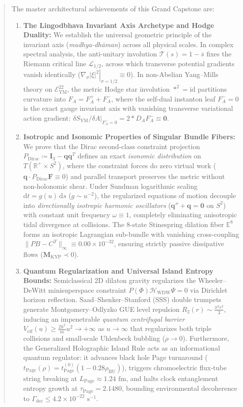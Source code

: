 \documentclass[11pt,a4paper,reqno]{article}
\theoremstyle{plain}
\theoremstyle{definition}
\theoremstyle{remark}
\numberwithin{equation}{section}
\numberwithin{table}{section}
\newcommand{\Eym}{\mathcal{E}_{\mathrm{YM}}^{22}}
\providecommand{\diff}{\mathrm{d}}
\begin{document}
\begin{abstract}
The master architectural achievements of this Grand Capstone are:
\begin{enumerate}[label=\textbf{(\roman*)}, leftmargin=2.2em]
  \item \textbf{The Lingodbhava Invariant Axis Archetype and Hodge Duality:} We establish the universal geometric principle of the invariant axis (\emph{madhya-dh\={a}man}) across all physical scales. In complex spectral analysis, the anti-unitary involution $\mathcal{T}(s) = 1 - \bar{s}$ fixes the Riemann critical line $\mathcal{L}_{1/2}$, across which transverse potential gradients vanish identically ($\left.\nabla_\sigma |\xi|^2\right|_{\sigma=1/2} \equiv 0$). In non-Abelian Yang--Mills theory on $\Eym$, the metric Hodge star involution $*^2 = \mathrm{id}$ partitions curvature into $F_A = F_A^+ + F_A^-$, where the self-dual instanton leaf $F_A^- = 0$ is the exact gauge invariant axis with vanishing transverse variational action gradient: $\left.\delta S_{\mathrm{YM}}/\delta A\right|_{F_A^- = 0} = 2*D_A F_A^- \equiv \mathbf{0}$.
  \item \textbf{Isotropic and Isonomic Properties of Singular Bundle Fibers:} We prove that the Dirac second-class constraint projection $P_{\mathrm{Dirac}} \coloneqq \bm{I}_3 - \bm{q}\bm{q}^T$ defines an exact \emph{isonomic distribution} on $T(\mathbb{R}^+ \times S^2)$, where the constraint forces do zero virtual work ($\bm{q} \cdot P_{\mathrm{Dirac}}\bm{F} \equiv 0$) and parallel transport preserves the metric without non-holonomic shear. Under Sundman logarithmic scaling $\diff t = g(u)\,\diff s$ ($g \sim u^{-2}$), the regularized equations of motion decouple into \emph{directionally isotropic harmonic oscillators} ($\bm{q}'' + \bm{q} = \bm{0}$ on $S^2$) with constant unit frequency $\omega \equiv 1$, completely eliminating anisotropic tidal divergence at collisions. The 8-state Stinespring dilation fiber $\mathbb{E}^8$ forms an isotropic Lagrangian sub-bundle with vanishing cross-coupling $\|PB - C^T\|_\infty \equiv 0.00 \times 10^{-32}$, ensuring strictly passive dissipative flows ($\mathbf{M}_{\mathrm{KYP}} \prec 0$).
  \item \textbf{Quantum Regularization and Universal Island Entropy Bounds:} Semiclassical 2D dilaton gravity regularizes the Wheeler--DeWitt minisuperspace constraint $P(\Phi)\mathcal{H}_{\mathrm{WDW}}\Psi = 0$ via Dirichlet horizon reflection. Saad--Shenker--Stanford (SSS) double trumpets generate Montgomery--Odlyzko GUE level repulsion $R_2(r) \sim \frac{\pi^2 r^2}{3}$, inducing an impenetrable \emph{quantum centrifugal barrier} $V_{\mathrm{eff}}(u) \ge \frac{2\hbar^2}{m}u^2 \to +\infty$ as $u \to \infty$ that regularizes both triple collisions and small-scale Uhlenbeck bubbling ($\rho \to 0$). Furthermore, the Generalized Holographic Island Rule acts as an informational quantum regulator: it advances black hole Page turnaround ($t_{\mathrm{Page}}(\rho) = t_{\mathrm{Page}}^{(0)}(1 - 0.28\rho_{\mathrm{BU}})$), triggers chromoelectric flux-tube string breaking at $L_{\mathrm{Page}} \approx 1.24\text{ fm}$, and halts clock entanglement entropy growth at $\tau_{\mathrm{Page}} = 2.1480$, bounding environmental decoherence to $\Gamma_{\mathrm{dec}} \le 4.2 \times 10^{-22}\text{ s}^{-1}$.

\end{enumerate}
\end{abstract}
\end{document}
